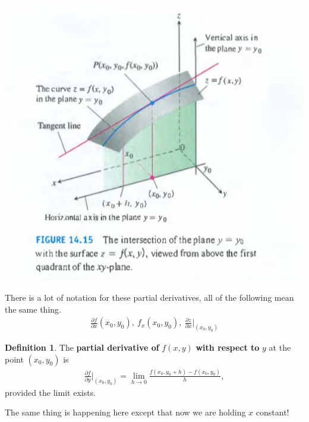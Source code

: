 \documentclass[12pt, letter]{article}
\theoremstyle{plain}
\numberwithin{theorem}{section}
\theoremstyle{definition}
\newtheorem{definition}[theorem]{Definition}
\begin{document}
\begin{center}
\includegraphics[scale=0.7]{m2_f3}
\end{center}

\bigskip

There is a lot of notation for these partial derivatives, all of the following mean the same thing.
\begin{align*}
\frac{\partial f}{\partial x} (x_0,y_0), \ f_x(x_0,y_0), \ \frac{\partial z}{\partial x}\bigg\rvert_{(x_0,y_0)}
\end{align*}

\bigskip

\hrulefill

\bigskip

\begin{definition}
The \textbf{partial derivative of} $f(x,y)$ \textbf{with respect to} $y$ at the point $(x_0,y_0)$ is
\begin{align*}
\frac{\partial f}{\partial y} \bigg\rvert_{(x_0,y_0)} = \lim_{h\to 0} \frac{f(x_0,y_0+h)-f(x_0,y_0)}{h},
\end{align*}
provided the limit exists.
\end{definition}

\bigskip

The same thing is happening here except that now we are holding $x$ constant!

\bigskip
\end{document}
